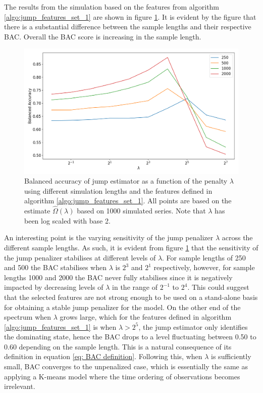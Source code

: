 The results from the simulation based on the features from algorithm \ref{algo:jump_features_set_1} are shown in figure \ref{fig: BAC plot feature set 1}. It is evident by the figure that there is a substantial difference between the sample lengths and their respective BAC. Overall the BAC score is increasing in the sample length. 

\begin{figure}[H] 
    \centering
    \includegraphics[width=1\textwidth]{analysis/model_convergence/images/jump_penalties_feature_set_1.png}
    \caption{Balanced accuracy of jump estimator as a function of the penalty $\lambda$ using different simulation lengths and the features defined in algorithm \ref{algo:jump_features_set_1}. All points are based on the estimate $\hat{\Omega} (\lambda)$ based on 1000 simulated series. Note that $\lambda$ has been log scaled with base 2.}
    \label{fig: BAC plot feature set 1}
\end{figure}

An interesting point is the varying sensitivity of the jump penalizer $\lambda$ across the different sample lengths. As such, it is evident from figure \ref{fig: BAC plot feature set 1} that the sensitivity of the jump penalizer stabilises at different levels of $\lambda$. For sample lengths of 250 and 500 the BAC stabilises when $\lambda$ is $2^3$ and $2^1$ respectively, however, for sample lengths 1000 and 2000 the BAC never fully stabilises since it is negatively impacted by decreasing levels of $\lambda$ in the range of $2^{-1}$ to $2^4$. This could suggest that the selected features are not strong enough to be used on a stand-alone basis for obtaining a stable jump penalizer for the model. On the other end of the spectrum when $\lambda$ grows large, which for the features defined in algorithm \ref{algo:jump_features_set_1} is when $\lambda > 2^5$, the jump estimator only identifies the dominating state, hence the BAC drops to a level fluctuating between 0.50 to 0.60 depending on the sample length. This is a natural consequence of its definition in equation \ref{eq: BAC definition}. Following this, when $\lambda$ is sufficiently small, BAC converges to the unpenalized case, which is essentially the same as applying a K-means model where the time ordering of observations becomes irrelevant. 

